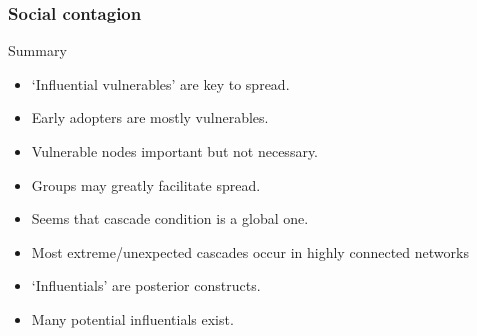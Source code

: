 \begin{frame}
  \frametitle{Social contagion}

  \begin{block}{Summary}
    \begin{itemize}

    \item<1-> \alert{`Influential vulnerables'} are key to spread.
    \item<2-> Early adopters are mostly vulnerables.
    \item<3-> Vulnerable nodes important but not necessary.
    \item<4-> Groups may greatly facilitate spread.
    \item<5-> Seems that cascade condition is a global one.
    \item<6-> Most extreme/unexpected cascades occur in highly connected networks 
    \item<7-> `Influentials' are posterior constructs.\\
    \item<8-> Many potential influentials exist.
    \end{itemize}
  \end{block}
  
\end{frame}


